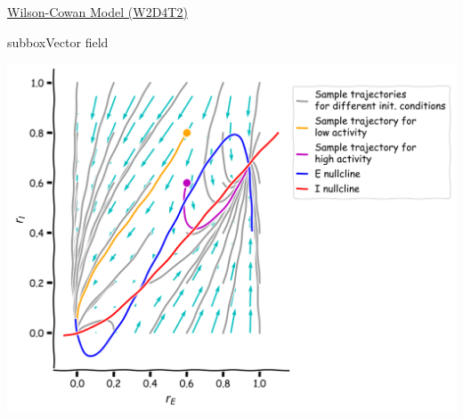 \begin{textbox}{\href{https://compneuro.neuromatch.io/tutorials/W2D4_DynamicNetworks/chapter_title.html}{Wilson-Cowan Model (W2D4T2)} }
\begin{subbox}{subbox}{Vector field}
\begin{center}
\includegraphics[scale=0.13]{Figures/DN/DN_Figure10.png}
\end{center}

\end{subbox}
\end{textbox}
